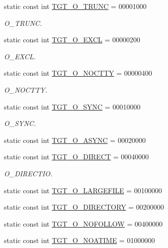 \begin{DoxyCompactItemize}
static const int \hyperlink{classX86Linux64_a4f892ee6e1424a2becd859b0bef1f18b}{TGT\_\-O\_\-TRUNC} = 00001000
\begin{DoxyCompactList}\small\item\em O\_\-TRUNC. \item\end{DoxyCompactList}\item 
static const int \hyperlink{classX86Linux64_a10d5d118d15b51ebdd4b16dc78342d1d}{TGT\_\-O\_\-EXCL} = 00000200
\begin{DoxyCompactList}\small\item\em O\_\-EXCL. \item\end{DoxyCompactList}\item 
static const int \hyperlink{classX86Linux64_adfd4240281579e5f60c5e22c601225d8}{TGT\_\-O\_\-NOCTTY} = 00000400
\begin{DoxyCompactList}\small\item\em O\_\-NOCTTY. \item\end{DoxyCompactList}\item 
static const int \hyperlink{classX86Linux64_abf43ab05d2a5b6b8113952160d8565db}{TGT\_\-O\_\-SYNC} = 00010000
\begin{DoxyCompactList}\small\item\em O\_\-SYNC. \item\end{DoxyCompactList}\item 
static const int \hyperlink{classX86Linux64_a83565a2a25516c6f6851ab78b9fc6ebe}{TGT\_\-O\_\-ASYNC} = 00020000
\item 
static const int \hyperlink{classX86Linux64_ae5d685a6a2ee8c6fe0ede370f0bec588}{TGT\_\-O\_\-DIRECT} = 00040000
\begin{DoxyCompactList}\small\item\em O\_\-DIRECTIO. \item\end{DoxyCompactList}\item 
static const int \hyperlink{classX86Linux64_a9600e092a6309f94d92129ce5f85b945}{TGT\_\-O\_\-LARGEFILE} = 00100000
\item 
static const int \hyperlink{classX86Linux64_a1f10d158ad65ad6389078ba44629788a}{TGT\_\-O\_\-DIRECTORY} = 00200000
\item 
static const int \hyperlink{classX86Linux64_a9c27f68ab31ddfdd3e35800ea1f02a89}{TGT\_\-O\_\-NOFOLLOW} = 00400000
\item 
static const int \hyperlink{classX86Linux64_a0ee8b0c23c2babc48e978e872b03c82c}{TGT\_\-O\_\-NOATIME} = 01000000

\end{DoxyCompactItemize}
